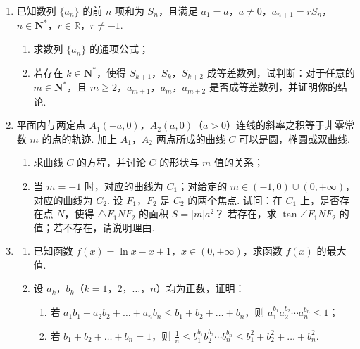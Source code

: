 \begin{description}
\begin{enumerate}[leftmargin=5pt]
        \item 已知数列 \(\{a_{n}\}\) 的前 \(n\) 项和为 \(S_{n}\)，且满足 \(a_{1} = a\)，\(a \neq 0\)，\(a_{n+1} = rS_{n}\)，\(n \in \mathbf{N}^{*}\)，\(r \in \mathbb{R}\)，\(r \neq -1\).
\begin{enumerate}
\item 求数列 \( \{a_{n}\} \) 的通项公式；
\item 若存在 \(k \in \mathbf{N}^*\)，使得 \(S_{k+1}\)，\(S_k\)，\(S_{k+2}\) 成等差数列，试判断：对于任意的 \(m \in \mathbf{N}^*\)，且 \(m \geqslant 2\)，\(a_{m+1}\)，\(a_m\)，\(a_{m+2}\) 是否成等差数列，并证明你的结论.
\end{enumerate}

        \item 平面内与两定点 \(A_{1}(-a,0)\)，\(A_{2}(a,0)\)（\(a > 0\)）连线的斜率之积等于非零常数 \(m\) 的点的轨迹. 加上 \(A_{1}\)，\(A_{2}\) 两点所成的曲线 \(C\) 可以是圆，椭圆或双曲线.
\begin{enumerate}
\item 求曲线 \(C\) 的方程，并讨论 \(C\) 的形状与 \(m\) 值的关系；
\item 当 \(m = -1\) 时，对应的曲线为 \(C_1\)；对给定的 \(m \in (-1,0) \cup (0, +\infty)\)，对应的曲线为 \(C_2\). 设 \(F_1\)，\(F_2\) 是 \(C_2\) 的两个焦点. 试问：在 \(C_1\) 上，是否存在点 \(N\)，使得 \(\triangle F_1NF_2\) 的面积 \(S = |m|a^2\)？ 若存在，求 \(\tan \angle F_1NF_2\) 的值；若不存在，请说明理由.
\end{enumerate}

        \item \begin{enumerate}
\item 已知函数 \(f(x) = \ln x - x + 1\)，\(x \in (0, +\infty)\)，求函数 \( f(x) \) 的最大值.

\item 设 \(a_k\)，\(b_k\)（\(k = 1\)，\(2\)，\(\dots\)，\(n\)）均为正数，证明：

\begin{enumerate}
\item 若 \(a_1b_1 + a_2b_2 + \dots + a_nb_n \leqslant b_1 + b_2 + \dots + b_n\)，则 \(a_1^{b_1} a_2^{b_2} \cdots a_n^{b_n} \leqslant 1\)；
\item 若 \(b_{1} + b_{2} + \dots + b_{n} = 1\)，则 \(\frac{1}{n} \leqslant b_{1}^{b_{1}} b_{2}^{b_{2}} \cdots b_{n}^{b_{n}} \leqslant b_{1}^{2} + b_{2}^{2} + \dots + b_{n}^{2}\).
\end{enumerate}
\end{enumerate}

    \end{enumerate}

\end{description}



